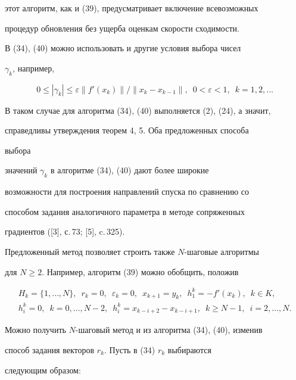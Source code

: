 этот алгоритм, как и (39), предусматривает включение всевозможных


процедур обновления без ущерба оценкам скорости сходимости.





В (34), (40) можно использовать и другие условия выбора чисел


$\gamma_k$, например,


$$


0\leq |\gamma_k|\leq \varepsilon \|f'(x_k)\| /


\|x_k-x_{k-1}\|,\ \; 0<\varepsilon <1,\ \; k=1,2,\dotsc


$$


В таком случае для алгоритма (34), (40) выполняется (2), (24), а значит,


справедливы утверждения теорем 4, 5. Оба предложенных способа 


выбора


значений $\gamma_k$ в алгоритме (34), (40) дают более широкие 


возможности для построения направлений спуска по сравнению со 


способом задания аналогичного параметра в методе сопряженных 


градиентов ([3], с.\,73; [5], c.\,325). 





Предложенный метод позволяет строить также $N$-шаговые алгоритмы


для $N\geq 2$. Например, алгоритм (39) можно обобщить, положив


\begin{gather*}


H_k=\{1,\dotsc,N\},\ \;r_k=0,\ \; \varepsilon_k=0,


\ \; x_{k+1}=y_k,\ \; h^k_1=-{f}'(x_k),\ \; k\in K,\\


h^k_i=0,\ \; k=0,\dotsc,N-2,\ \; h^k_i=x_{k-i+2}-x_{k-i+1},\ \;


k\geq N-1,\ \; i=2,\dotsc,N.


\end{gather*}





Можно получить $N$-шаговый метод и из алгоритма (34), (40), изменив 


способ задания векторов $r_k$. Пусть в (34)\; $r_k$ выбираются 


следующим образом:


